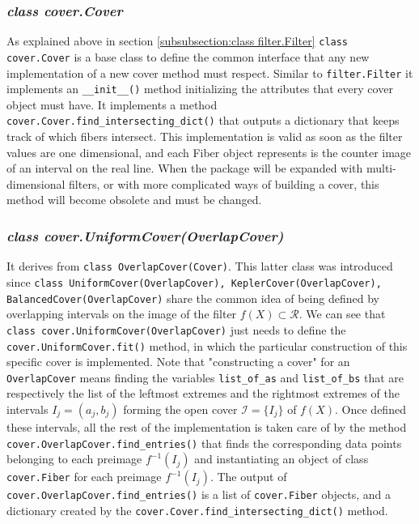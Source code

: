 \subsubsection{\textit{class cover.Cover}}
As explained above in section \ref{subsubsection:class filter.Filter} \lstinline|class cover.Cover| is a base class to define the common interface that any new implementation of a new cover method must respect. Similar to \lstinline|filter.Filter| it implements an \lstinline|__init__()| method initializing the attributes that every cover object must have. It implements a method \lstinline{cover.Cover.find_intersecting_dict()} that outputs a dictionary that keeps track of which fibers intersect. This implementation is valid as soon as the filter values are one dimensional, and each Fiber object represents is the counter image of an interval on the real line. When the package will be expanded with multi-dimensional filters, or with more complicated ways of building a cover, this method will become obsolete and must be changed.
\subsubsection{\textit{class cover.UniformCover(OverlapCover)}}
It derives from \lstinline|class OverlapCover(Cover)|. This latter class was introduced since \lstinline|class UniformCover(OverlapCover), KeplerCover(OverlapCover), BalancedCover(OverlapCover)| share the common idea of being defined by overlapping intervals on the image of the filter $f(X)\subset\mathcal R$. We can see that  \lstinline|class cover.UniformCover(OverlapCover)| just needs to define the \lstinline{cover.UniformCover.fit()} method, in which the particular construction of this specific cover is implemented. Note that "constructing a cover" for an \lstinline{OverlapCover} means finding the variables  \lstinline|list_of_as| and  \lstinline|list_of_bs| that are respectively the list of the leftmost extremes and the rightmost extremes of the intervals $I_j=(a_j, b_j)$ forming the open cover $\mathcal I = \{I_j\}$ of $f(X)$. Once defined these intervals, all the rest of the implementation is taken care of by the method \lstinline|cover.OverlapCover.find_entries()| that finds the corresponding data points belonging to each preimage $f^{-1}(I_j)$ and instantiating an object of class \lstinline|cover.Fiber| for each preimage $f^{-1}(I_j)$. The output  of \lstinline|cover.OverlapCover.find_entries()| is a list of \lstinline|cover.Fiber| objects, and a dictionary created by the \lstinline|cover.Cover.find_intersecting_dict()| method.
